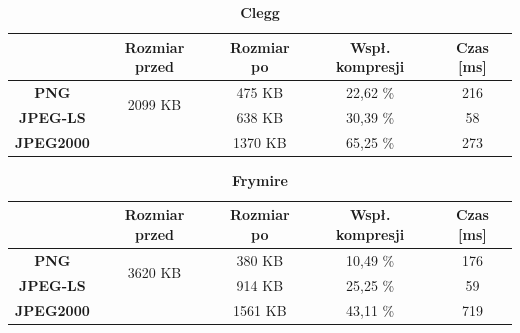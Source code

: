 \begin{table}[!h]
	\centering
	\caption{\textbf{Clegg}}
	\label{my-label}
	\begin{tabular}{|c|c|c|c|c|}                                             
		\hline
		& \textbf{Rozmiar przed} & \textbf{Rozmiar po} & \textbf{Wspł. kompresji} & \textbf{Czas {[}ms{]}} \\ \hline 
		\textbf{PNG}      &          \multicolumn{1}{c|}{\multirow{2}{*}{2099 KB}}             &      475 KB               &         22,62 \%                 &              216               \\\cline{3-5}
		\textbf{JPEG-LS}  &                        &        638  KB         &      30,39 \%                  &         58                 \\\cline{3-5}
		\textbf{JPEG2000} &                        &        1370 KB             &       65,25 \%                   &        273              \\ \hline
	\end{tabular}
\end{table}

\begin{table}[!h]
	\centering
	\caption{\textbf{Frymire}}
	\label{my-label}
	\begin{tabular}{|c|c|c|c|c|}                                             
		\hline
		& \textbf{Rozmiar przed} & \textbf{Rozmiar po} & \textbf{Wspł. kompresji} & \textbf{Czas {[}ms{]}} \\ \hline 
		\textbf{PNG}      &          \multicolumn{1}{c|}{\multirow{2}{*}{3620 KB}}             &         380 KB              &        10,49 \%                   &            176                 \\\cline{3-5}
		\textbf{JPEG-LS}  &                        &        914 KB             &         25,25 \%                 &           59               \\\cline{3-5}
		\textbf{JPEG2000} &                        &         1561 KB               &          43,11 \%                &       719               \\ \hline
	\end{tabular}
\end{table}

